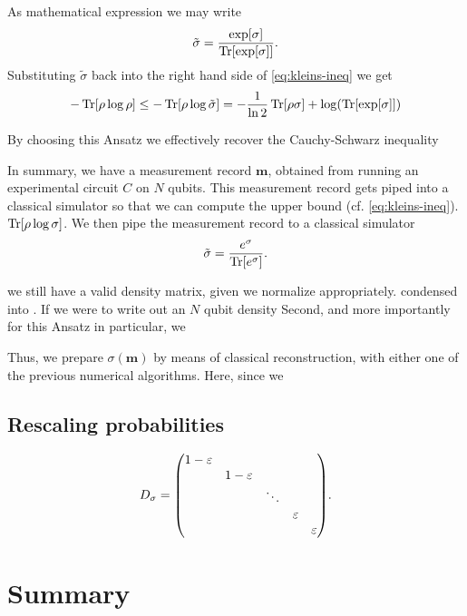 As mathematical expression we may write
\begin{align}
  \tilde{\sigma} = \frac{\exp[\sigma]}{\Tr[\exp[\sigma]]}
.\end{align}
Substituting $\tilde{\sigma}$ back into the right hand side of
\cref{eq:kleins-ineq} we get
\begin{align}
  -\Tr[\rho\log\rho]\leq-\Tr[\rho\log\tilde{\sigma}] = -\frac{1}{\ln 2}\Tr[\rho\sigma] +
  \log(\Tr[\exp[\sigma]])
\end{align}

By choosing this Ansatz we effectively recover the Cauchy-Schwarz inequality

In summary, we have a measurement record $\mathbf{m}$, obtained from running an
experimental circuit $C$ on $N$ qubits. This measurement record gets piped into
a classical simulator so that we can compute the upper bound (cf.
\cref{eq:kleins-ineq}). 
$\Tr[\rho\log\sigma]$. 
We then pipe the measurement record to a classical
simulator 
\begin{align}
  \tilde{\sigma} = \frac{e^\sigma}{\Tr[e^\sigma]}
.\end{align}

we still have a valid density matrix, given we normalize appropriately. 
condensed into . If we were to write out an $N$ qubit
density 
Second, and more importantly for this Ansatz in particular, we

Thus, we prepare $\sigma(\mathbf{m})$ by means of classical reconstruction,
with either one of the previous numerical algorithms. Here, since we 
\subsection{Rescaling probabilities}
\begin{align}
  D_\sigma = \mqty(\dmat{1-\varepsilon,1-\varepsilon,\ddots,\varepsilon,\varepsilon})
.\end{align}

\section{Summary}

\clearpage
